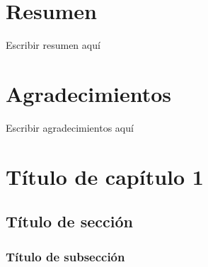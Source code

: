 \documentclass[12pt,a4paper,oneside]{report}
\begin{document}

\chapter*{\centering \large Resumen} 
{Escribir resumen aquí}\\[0.5cm]





\chapter*{\centering \large Agradecimientos}

\justify
{Escribir agradecimientos aquí}\\[0.5cm]


\cleardoublepage
{}
\tableofcontents \newpage
{}
\listoffigures \newpage
{}
\listoftables \newpage
\makegloss
\newpage
{}

\doublespacing
\chapter{Título de capítulo 1}
\section{Título de sección}
\subsection{Título de subsección}
\end{document}
